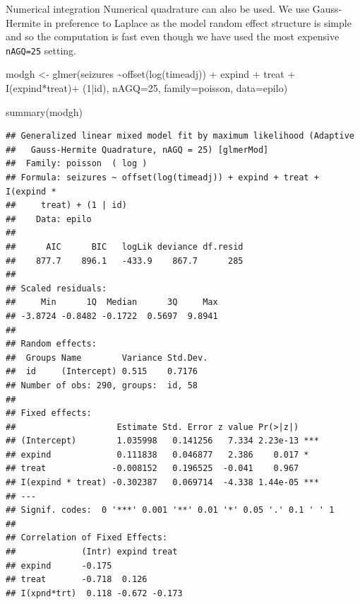 \documentclass[
  ignorenonframetext,
]{beamer}
\newenvironment{Shaded}{\begin{snugshade}}{\end{snugshade}}
\newcommand{\AttributeTok}[1]{\textcolor[rgb]{0.77,0.63,0.00}{#1}}
\newcommand{\DecValTok}[1]{\textcolor[rgb]{0.00,0.00,0.81}{#1}}
\newcommand{\FunctionTok}[1]{\textcolor[rgb]{0.00,0.00,0.00}{#1}}
\newcommand{\NormalTok}[1]{#1}
\newcommand{\OtherTok}[1]{\textcolor[rgb]{0.56,0.35,0.01}{#1}}
\newcommand{\SpecialCharTok}[1]{\textcolor[rgb]{0.00,0.00,0.00}{#1}}
\begin{document}
\begin{frame}[fragile]{Numerical integration}
\protect\hypertarget{numerical-integration}{}
Numerical quadrature can also be used. We use Gauss-Hermite in
preference to Laplace as the model random effect structure is simple and
so the computation is fast even though we have used the most expensive
\texttt{nAGQ=25} setting. \vspace{12pt} \tiny

\begin{Shaded}
\begin{Highlighting}[]
\NormalTok{modgh }\OtherTok{\textless{}{-}} \FunctionTok{glmer}\NormalTok{(seizures }\SpecialCharTok{\textasciitilde{}}\FunctionTok{offset}\NormalTok{(}\FunctionTok{log}\NormalTok{(timeadj)) }\SpecialCharTok{+}\NormalTok{ expind }\SpecialCharTok{+}\NormalTok{ treat }\SpecialCharTok{+} 
  \FunctionTok{I}\NormalTok{(expind}\SpecialCharTok{*}\NormalTok{treat)}\SpecialCharTok{+}\NormalTok{ (}\DecValTok{1}\SpecialCharTok{|}\NormalTok{id), }\AttributeTok{nAGQ=}\DecValTok{25}\NormalTok{, }\AttributeTok{family=}\NormalTok{poisson, }\AttributeTok{data=}\NormalTok{epilo)}
\end{Highlighting}
\end{Shaded}
\end{frame}

\begin{frame}[fragile]{}
\protect\hypertarget{section-10}{}
\tiny

\begin{Shaded}
\begin{Highlighting}[]
\FunctionTok{summary}\NormalTok{(modgh)}
\end{Highlighting}
\end{Shaded}

\begin{verbatim}
## Generalized linear mixed model fit by maximum likelihood (Adaptive
##   Gauss-Hermite Quadrature, nAGQ = 25) [glmerMod]
##  Family: poisson  ( log )
## Formula: seizures ~ offset(log(timeadj)) + expind + treat + I(expind *  
##     treat) + (1 | id)
##    Data: epilo
## 
##      AIC      BIC   logLik deviance df.resid 
##    877.7    896.1   -433.9    867.7      285 
## 
## Scaled residuals: 
##     Min      1Q  Median      3Q     Max 
## -3.8724 -0.8482 -0.1722  0.5697  9.8941 
## 
## Random effects:
##  Groups Name        Variance Std.Dev.
##  id     (Intercept) 0.515    0.7176  
## Number of obs: 290, groups:  id, 58
## 
## Fixed effects:
##                    Estimate Std. Error z value Pr(>|z|)    
## (Intercept)        1.035998   0.141256   7.334 2.23e-13 ***
## expind             0.111838   0.046877   2.386    0.017 *  
## treat             -0.008152   0.196525  -0.041    0.967    
## I(expind * treat) -0.302387   0.069714  -4.338 1.44e-05 ***
## ---
## Signif. codes:  0 '***' 0.001 '**' 0.01 '*' 0.05 '.' 0.1 ' ' 1
## 
## Correlation of Fixed Effects:
##             (Intr) expind treat 
## expind      -0.175              
## treat       -0.718  0.126       
## I(xpnd*trt)  0.118 -0.672 -0.173
\end{verbatim}
\end{frame}
\end{document}
